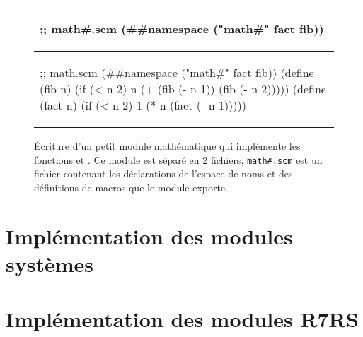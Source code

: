 \begin{center}
  \begin{figure}[h]
  \begin{tabular}{|l|}
\hline
\begin{mplisting}{0.5}
;; math#.scm
(##namespace ("math#" fact fib))
\end{mplisting} \\\hline
\begin{mplisting}{0.6}
;; math.scm
(##namespace ("math#" fact fib))
(define (fib n)
  (if (< n 2)
    n
    (+ (fib (- n 1)) (fib (- n 2)))))
(define (fact n)
  (if (< n 2)
    1
    (* n (fact (- n 1)))))
\end{mplisting}\\\hline
  \end{tabular}
  \caption{Écriture d'un petit module mathématique qui implémente les fonctions 
    et . Ce module est séparé en 2 fichiers, \texttt{math\#.scm} est un fichier
    contenant les déclarations de l'espace de noms et des définitions de macros que le module
    exporte.}
  \label{fig:math_module1}
\end{figure}
\end{center}

%

\section{Implémentation des modules systèmes}

\section{Implémentation des modules R7RS}
